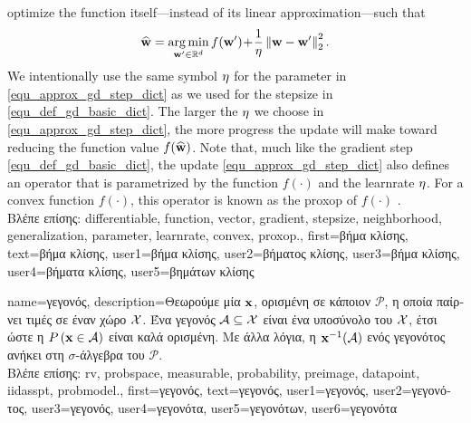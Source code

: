 {{		optimize the \gls{function} itself—instead of its linear approximation—such that
		\begin{align} 
		\label{equ_approx_gd_step_dict}
		\widehat{{\bf w}} = \operatorname*{arg\,min}_{{\bf w}' \in \mathbb{R}^{d}} f({\bf w}')\!+\!\frac{1}{\eta}\left\Vert {{\bf w}-{\bf w}'} \right\Vert_{2}^2. 
		\end{align}
		We intentionally use the same symbol $\eta$ for the \gls{parameter} in \eqref{equ_approx_gd_step_dict} 
		as we used for the \gls{stepsize} in \eqref{equ_def_gd_basic_dict}. The larger the $\eta$ we choose in 
		\eqref{equ_approx_gd_step_dict}, the more progress the update will make toward reducing the 
		\gls{function} value $f(\widehat{{\bf w}})$. Note that, much like the \gls{gradient} step \eqref{equ_def_gd_basic_dict}, 
		the update \eqref{equ_approx_gd_step_dict} also defines an operator 
		that is parametrized by the \gls{function} $f(\cdot)$ and the \gls{learnrate} $\eta$. For a \gls{convex} \gls{function} 
		$f(\cdot)$, this operator is known as the \gls{proxop} of $f(\cdot)$ \cite{ProximalMethods}.\\ 
		\foreignlanguage{greek}{Βλέπε επίσης:} \gls{differentiable}, \gls{function}, \gls{vector}, \gls{gradient}, \gls{stepsize}, \gls{neighborhood}, 
		\gls{generalization}, \gls{parameter}, \gls{learnrate}, \gls{convex}, \gls{proxop}.},
	first={\foreignlanguage{greek}{βήμα κλίσης}},
	text={\foreignlanguage{greek}{βήμα κλί\-σης}},
	user1={\foreignlanguage{greek}{βήμα κλίσης}}, %
	user2={\foreignlanguage{greek}{βήματος κλίσης}}, %
	user3={\foreignlanguage{greek}{βήμα κλίσης}}, %
	user4={\foreignlanguage{greek}{βήματα κλίσης}}, %
	user5={\foreignlanguage{greek}{βημάτων κλίσης}} %
}

{name={\foreignlanguage{greek}{γεγονός}}, 
	description={\foreignlanguage{greek}{Θεωρούμε μία}  ${\bf x}$, 
		\foreignlanguage{greek}{ορισμένη σε κάποιον}  $\mathcal{P}$, 
		\foreignlanguage{greek}{η οποία παίρνει τιμές σε έναν}  \foreignlanguage{greek}{χώρο $\mathcal{X}$. 
		Ένα γεγονός $\mathcal{A} \subseteq \mathcal{X}$ είναι ένα υποσύνολο του $\mathcal{X}$, έτσι ώστε η}  
		$P\left({\bf x} \in \mathcal{A}\right)$ \foreignlanguage{greek}{είναι καλά ορισμένη. Με άλλα λόγια, η}  
		${\bf x}^{-1}(\mathcal{A})$ \foreignlanguage{greek}{ενός γεγονότος ανήκει στη $\sigma$-άλγεβρα του} $\mathcal{P}$. \\
		\foreignlanguage{greek}{Βλέπε επίσης:} \gls{rv}, \gls{probspace}, \gls{measurable}, \gls{probability}, 
		\gls{preimage}, \gls{datapoint}, \gls{iidasspt}, \gls{probmodel}.},
	first={\foreignlanguage{greek}{γεγονός}},
	text={\foreignlanguage{greek}{γεγονός}},
	user1={\foreignlanguage{greek}{γεγονός}}, %
  	user2={\foreignlanguage{greek}{γεγονότος}}, %
	user3={\foreignlanguage{greek}{γεγονός}}, %
	user4={\foreignlanguage{greek}{γεγονότα}}, %
  	user5={\foreignlanguage{greek}{γεγονότων}}, %
	user6={\foreignlanguage{greek}{γεγονότα}} %
}


